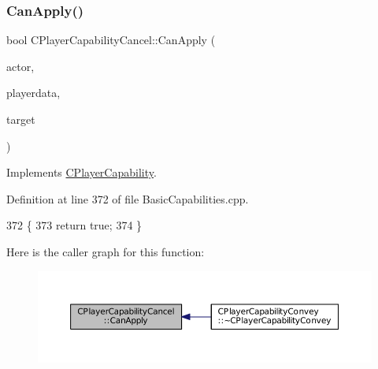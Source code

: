 \subsubsection{\texorpdfstring{Can\+Apply()}{CanApply()}}
{\footnotesize\ttfamily bool C\+Player\+Capability\+Cancel\+::\+Can\+Apply (\begin{DoxyParamCaption}\item[{std\+::shared\+\_\+ptr$<$ \hyperlink{classCPlayerAsset}{C\+Player\+Asset} $>$}]{actor,  }\item[{std\+::shared\+\_\+ptr$<$ \hyperlink{classCPlayerData}{C\+Player\+Data} $>$}]{playerdata,  }\item[{std\+::shared\+\_\+ptr$<$ \hyperlink{classCPlayerAsset}{C\+Player\+Asset} $>$}]{target }\end{DoxyParamCaption})\hspace{0.3cm}{\ttfamily [virtual]}}



Implements \hyperlink{classCPlayerCapability_ae96263e0950f496492f8baeb877b9554}{C\+Player\+Capability}.



Definition at line 372 of file Basic\+Capabilities.\+cpp.


\begin{DoxyCode}
372                                                                                                            
                                                   \{
373     \textcolor{keywordflow}{return} \textcolor{keyword}{true};
374 \}
\end{DoxyCode}
Here is the caller graph for this function\+:\nopagebreak
\begin{figure}[H]
\begin{center}
\leavevmode
\includegraphics[width=350pt]{classCPlayerCapabilityCancel_a0221e4e768c998cb46f1dbc757647ec1_icgraph}
\end{center}
\end{figure}
\hypertarget{classCPlayerCapabilityCancel_a8b4ad4a4983b01e458d439cf68fd2ba9}{}\label{classCPlayerCapabilityCancel_a8b4ad4a4983b01e458d439cf68fd2ba9} 

